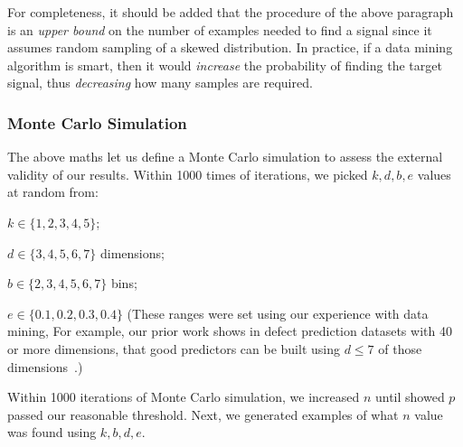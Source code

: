 For completeness, it should be added  that the procedure of the above paragraph is an {\em upper bound} on the
number of examples needed to find a signal since it
assumes random sampling of a skewed distribution. In
practice, if a data mining algorithm is smart, then
it would {\em increase} the probability of finding
the target signal, thus {\em decreasing} how many samples are required.

\subsubsection{Monte Carlo Simulation}
    The above maths let  us define
    a  Monte Carlo simulation to assess the external validity of our results.
    Within 1000 times of iterations, we picked $k,d,b,e$ values at random from:
    \squishlist
      \item $k \in \{1,2,3,4,5\}$;
  \item $d \in \{3,4,5,6,7\}$ dimensions;
  \item $b \in \{2,3,4,5,6,7\}$ bins; 
    \item $e\in \{0.1,0.2,0.3,0.4\}$
      \squishend
      (These ranges were set using our experience with data mining, For example, our prior work shows in defect prediction datasets
      with 40 or more dimensions, that good predictors can be built using $d\le 7$ of those dimensions~\cite{Menzies07}.)
      
     Within 1000 iterations of Monte Carlo simulation,
     we increased $n$ until  showed  $p$ passed our reasonable threshold.
     Next, we generated examples of what $n$ value was found using  $k,b,d,e$.
     
